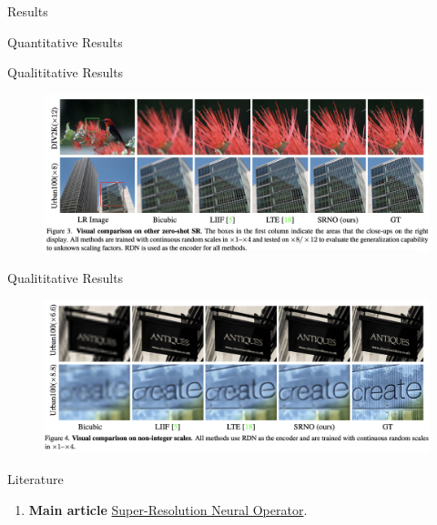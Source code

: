 \documentclass{beamer}
\begin{document}
\begin{section}{Results}
\begin{frame}{Quantitative Results}
    \end{frame}

    \begin{frame}{Qualititative Results}
    \begin{figure}
        \centering
        \includegraphics[width=\linewidth]{3.png}
    \end{figure}
    \end{frame}

    \begin{frame}{Qualititative Results}
    \begin{figure}
        \centering
        \includegraphics[width=\linewidth]{4.png}
    \end{figure}
    \end{frame}
\end{section}

\begin{frame}{Literature}
    \begin{enumerate}
        \item \textbf{Main article} \href{https://openaccess.thecvf.com/content/CVPR2023/papers/Wei_Super-Resolution_Neural_Operator_CVPR_2023_paper.pdf}
        {Super-Resolution Neural Operator}.
    \end{enumerate}
\end{frame}
\end{document}
